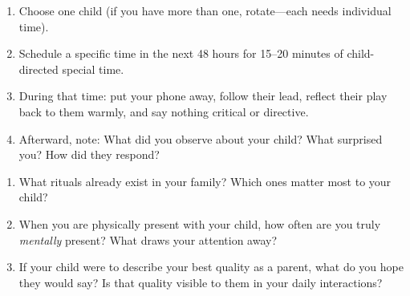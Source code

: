 \begin{practiceexercise}[title=Design a Special Time Practice]
\begin{enumerate}
  \item Choose one child (if you have more than one, rotate---each needs
        individual time).
  \item Schedule a specific time in the next 48 hours for 15--20 minutes
        of child-directed special time.
  \item During that time: put your phone away, follow their lead,
        reflect their play back to them warmly, and say nothing critical
        or directive.
  \item Afterward, note: What did you observe about your child? What
        surprised you? How did they respond?
\end{enumerate}
\end{practiceexercise}

\begin{reflection}
\begin{enumerate}
  \item What rituals already exist in your family? Which ones matter most
        to your child?
  \item When you are physically present with your child, how often are
        you truly \textit{mentally} present? What draws your attention away?
  \item If your child were to describe your best quality as a parent,
        what do you hope they would say? Is that quality visible to them
        in your daily interactions?
\end{enumerate}
\end{reflection}
